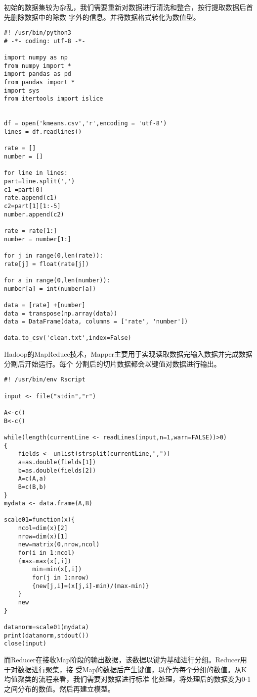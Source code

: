 初始的数据集较为杂乱，我们需要重新对数据进行清洗和整合，按行提取数据后首先删除数据中的除数
字外的信息。并将数据格式转化为数值型。

\begin{lstlisting}
#! /usr/bin/python3
# -*- coding: utf-8 -*-

import numpy as np
from numpy import *
import pandas as pd
from pandas import *
import sys
from itertools import islice


df = open('kmeans.csv','r',encoding = 'utf-8')
lines = df.readlines()

rate = []
number = []

for line in lines:
part=line.split(',')
c1 =part[0]
rate.append(c1)
c2=part[1][1:-5]
number.append(c2)

rate = rate[1:]
number = number[1:]

for j in range(0,len(rate)):
rate[j] = float(rate[j])

for a in range(0,len(number)):
number[a] = int(number[a])

data = [rate] +[number]
data = transpose(np.array(data))
data = DataFrame(data, columns = ['rate', 'number'])

data.to_csv('clean.txt',index=False)
\end{lstlisting}

Hadoop的MapReduce技术，Mapper主要用于实现读取数据完输入数据并完成数据分割后开始运行。每个
分割后的切片数据都会以键值对数据进行输出。

\begin{lstlisting}
#! /usr/bin/env Rscript

input <- file("stdin","r")

A<-c()
B<-c()

while(length(currentLine <- readLines(input,n=1,warn=FALSE))>0)
{
    fields <- unlist(strsplit(currentLine,","))
    a=as.double(fields[1])
    b=as.double(fields[2])
    A=c(A,a)
    B=c(B,b)
}
mydata <- data.frame(A,B)

scale01=function(x){
    ncol=dim(x)[2]
    nrow=dim(x)[1]
    new=matrix(0,nrow,ncol)
    for(i in 1:ncol)
    {max=max(x[,i])
        min=min(x[,i])
        for(j in 1:nrow)
        {new[j,i]=(x[j,i]-min)/(max-min)}
    }
    new
}

datanorm=scale01(mydata)
print(datanorm,stdout())
close(input)
\end{lstlisting}

而Reducer在接收Map阶段的输出数据，该数据以键为基础进行分组。Reducer用于对数据进行聚集，接
受Map的数据后产生键值，以作为每个分组的数值。从K均值聚类的流程来看，我们需要对数据进行标准
化处理，将处理后的数据变为0-1之间分布的数值。然后再建立模型。

